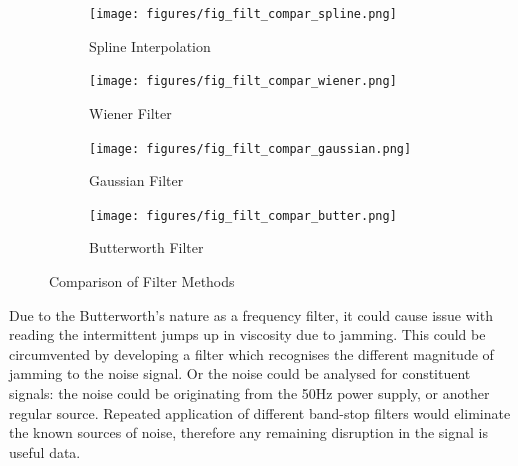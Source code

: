 \documentclass[twoside,a4]{report}
\begin{document}
	\begin{figure}[!htb]
		\centering
		\begin{subfigure}[t]{0.22\textwidth}
			\centering
			\texttt{[image: figures/fig\_filt\_compar\_spline.png]}
			\caption{Spline Interpolation}
			\label{figfiltsp}
			\footnotesize
		\end{subfigure}
		\begin{subfigure}[t]{0.22\textwidth}
			\centering
			\texttt{[image: figures/fig\_filt\_compar\_wiener.png]}
			\caption{Wiener Filter}
			\label{figfiltwi}
			\footnotesize
		\end{subfigure}
		\begin{subfigure}[t]{0.22\textwidth}
			\centering
			\texttt{[image: figures/fig\_filt\_compar\_gaussian.png]}
			\caption{Gaussian Filter}
			\label{figfiltga}
			\footnotesize
		\end{subfigure}
		\begin{subfigure}[t]{0.22\textwidth}
			\centering
			\texttt{[image: figures/fig\_filt\_compar\_butter.png]}
			\caption{Butterworth Filter}
			\label{figfiltbu}
			\footnotesize
		\end{subfigure}
		\caption{Comparison of Filter Methods \label{figfiltcomp}}
	\end{figure}
	
	\noindent
	Due to the Butterworth's nature as a frequency filter, it could cause issue with reading the intermittent jumps up in viscosity due to jamming. This could be circumvented by developing a filter which recognises the different magnitude of jamming to the noise signal. Or the noise could be analysed for constituent signals: the noise could be originating from the 50Hz power supply, or another regular source. Repeated application of different band-stop filters would eliminate the known sources of noise, therefore any remaining disruption in the signal is useful data.
	
\end{document}
